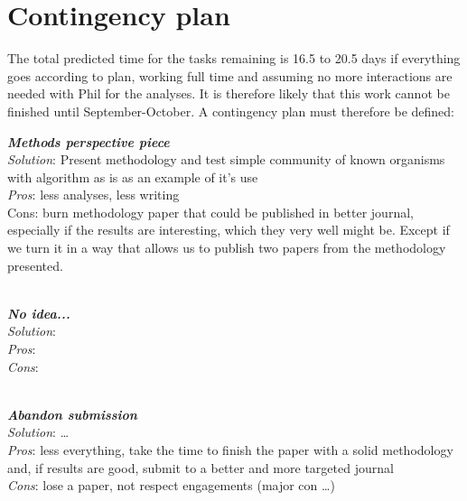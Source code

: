 \documentclass[letterpaper]{article}
\begin{document}
\section{Contingency plan}
The total predicted time for the tasks remaining is 16.5 to 20.5 days if everything goes according to plan, working full time and assuming no more interactions are needed with Phil for the analyses. It is therefore likely that this work cannot be finished until September-October. A contingency plan must therefore be defined:
\\
\par\textbf{\textit{Methods perspective piece}} \\
\hangindent=0.7cm \textit{Solution}: Present methodology and test simple community of known organisms with algorithm as is as an example of it's use \\
\hangindent=0.7cm \textit{Pros}: less analyses, less writing \\
\hangindent=0.7cm Cons: burn methodology paper that could be published in better journal, especially if the results are interesting, which they very well might be. Except if we turn it in a way that allows us to publish two papers from the methodology presented. \\
\\
\par\textbf{\textit{No idea...}} \\
\hangindent=0.7cm \textit{Solution}:  \\
\hangindent=0.7cm \textit{Pros}:  \\
\hangindent=0.7cm \textit{Cons}:  \\
\\
\par\textbf{\textit{Abandon submission}} \\
\hangindent=0.7cm \textit{Solution}: \dots \\
\hangindent=0.7cm \textit{Pros}: less everything, take the time to finish the paper with a solid methodology and, if results are good, submit to a better and more targeted journal \\
\hangindent=0.7cm \textit{Cons}: lose a paper, not respect engagements (major con \dots) \\
\end{document}
